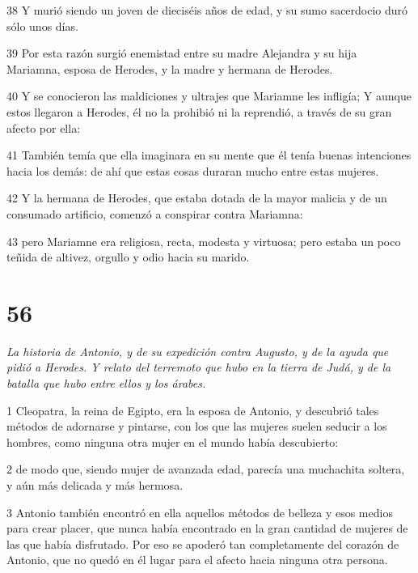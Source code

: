 \par 38 Y murió siendo un joven de dieciséis años de edad, y su sumo sacerdocio duró sólo unos días.

\par 39 Por esta razón surgió enemistad entre su madre Alejandra y su hija Mariamna, esposa de Herodes, y la madre y hermana de Herodes.

\par 40 Y se conocieron las maldiciones y ultrajes que Mariamne les infligía; Y aunque estos llegaron a Herodes, él no la prohibió ni la reprendió, a través de su gran afecto por ella:

\par 41 También temía que ella imaginara en su mente que él tenía buenas intenciones hacia los demás: de ahí que estas cosas duraran mucho entre estas mujeres.

\par 42 Y la hermana de Herodes, que estaba dotada de la mayor malicia y de un consumado artificio, comenzó a conspirar contra Mariamna:

\par 43 pero Mariamne era religiosa, recta, modesta y virtuosa; pero estaba un poco teñida de altivez, orgullo y odio hacia su marido.

\chapter{56}

\par \textit{La historia de Antonio, y de su expedición contra Augusto, y de la ayuda que pidió a Herodes. Y relato del terremoto que hubo en la tierra de Judá, y de la batalla que hubo entre ellos y los árabes.}

\par 1 Cleopatra, la reina de Egipto, era la esposa de Antonio, y descubrió tales métodos de adornarse y pintarse, con los que las mujeres suelen seducir a los hombres, como ninguna otra mujer en el mundo había descubierto:

\par 2 de modo que, siendo mujer de avanzada edad, parecía una muchachita soltera, y aún más delicada y más hermosa.

\par 3 Antonio también encontró en ella aquellos métodos de belleza y esos medios para crear placer, que nunca había encontrado en la gran cantidad de mujeres de las que había disfrutado. Por eso se apoderó tan completamente del corazón de Antonio, que no quedó en él lugar para el afecto hacia ninguna otra persona.

